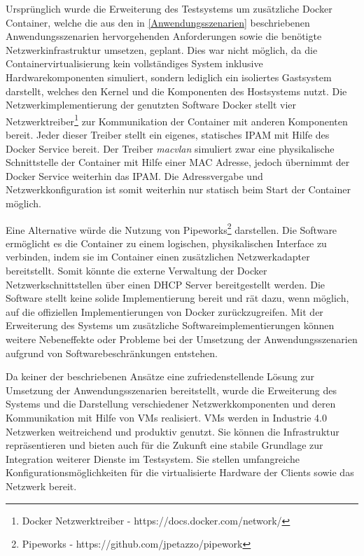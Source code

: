 Ursprünglich wurde die Erweiterung des Testsystems um zusätzliche Docker Container, welche die aus den in \autoref{Anwendungsszenarien} beschriebenen Anwendungsszenarien hervorgehenden Anforderungen sowie die benötigte Netzwerkinfrastruktur umsetzen, geplant. Dies war nicht möglich, da die Containervirtualisierung kein vollständiges System inklusive Hardwarekomponenten simuliert, sondern lediglich ein isoliertes Gastsystem darstellt, welches den Kernel und die Komponenten des Hostsystems nutzt. Die Netzwerkimplementierung der genutzten Software Docker stellt vier Netzwerktreiber\footnote{Docker Netzwerktreiber - https://docs.docker.com/network/} zur Kommunikation der Container mit anderen Komponenten bereit. Jeder dieser Treiber stellt ein eigenes, statisches \ac{IPAM} mit Hilfe des Docker Service bereit. Der Treiber \textit{macvlan} simuliert zwar eine physikalische Schnittstelle der Container mit Hilfe einer \ac{MAC} Adresse, jedoch übernimmt der Docker Service weiterhin das \ac{IPAM}. Die Adressvergabe und Netzwerkkonfiguration ist somit weiterhin nur statisch beim Start der Container möglich. 

Eine Alternative würde die Nutzung von Pipeworks\footnote{Pipeworks - https://github.com/jpetazzo/pipework} darstellen. Die Software ermöglicht es die Container zu einem logischen, physikalischen Interface zu verbinden, indem sie im Container einen zusätzlichen Netzwerkadapter bereitstellt. Somit könnte die externe Verwaltung der Docker Netzwerkschnittstellen über einen \ac{DHCP} Server bereitgestellt werden. Die Software stellt keine solide Implementierung bereit und rät dazu, wenn möglich, auf die offiziellen Implementierungen von Docker zurückzugreifen. Mit der Erweiterung des Systems um zusätzliche Softwareimplementierungen können weitere Nebeneffekte oder Probleme bei der Umsetzung der Anwendungsszenarien aufgrund von Softwarebeschränkungen entstehen.

Da keiner der beschriebenen Ansätze eine zufriedenstellende Lösung zur Umsetzung der Anwendungsszenarien bereitstellt, wurde die Erweiterung des Systems und die Darstellung verschiedener Netzwerkkomponenten und deren Kommunikation mit Hilfe von \ac{VM}s realisiert. \ac{VM}s werden in Industrie 4.0 Netzwerken weitreichend und produktiv genutzt. Sie können die Infrastruktur repräsentieren und bieten auch für die Zukunft eine stabile Grundlage zur Integration weiterer Dienste im Testsystem. Sie stellen umfangreiche Konfigurationsmöglichkeiten für die virtualisierte Hardware der Clients sowie das Netzwerk bereit.
